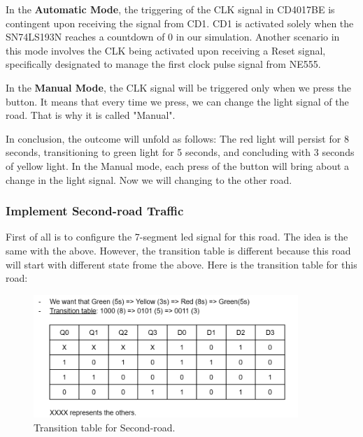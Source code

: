 \documentclass{article}
\begin{document}
In the \textbf{Automatic Mode}, the triggering of the CLK signal in CD4017BE is contingent upon receiving the signal from CD1. CD1 is activated solely when the SN74LS193N reaches a countdown of 0 in our simulation. Another scenario in this mode involves the CLK being activated upon receiving a Reset signal, specifically designated to manage the first clock pulse signal from NE555.\par
In the \textbf{Manual Mode}, the CLK signal will be triggered only when we press the button. It means that every time we press, we can change the light signal of the road. That is why it is called "Manual".\par

In conclusion, the outcome will unfold as follows: The red light will persist for 8 seconds, transitioning to green light for 5 seconds, and concluding with 3 seconds of yellow light. In the Manual mode, each press of the button will bring about a change in the light signal. Now we will changing to the other road.\par

\newpage
\subsubsection{Implement Second-road Traffic}
First of all is to configure the 7-segment led signal for this road. The idea is the same with the above. However, the transition table is different because this road will start with different state frome the above. Here is the transition table for this road:\par
\begin{figure}[h]
    \centering
    \includegraphics[width=10cm]{Pic/Proteus/transition table 2.png}
    \caption{Transition table for Second-road.}
    \label{fig:enter-label}
\end{figure}
\end{document}
